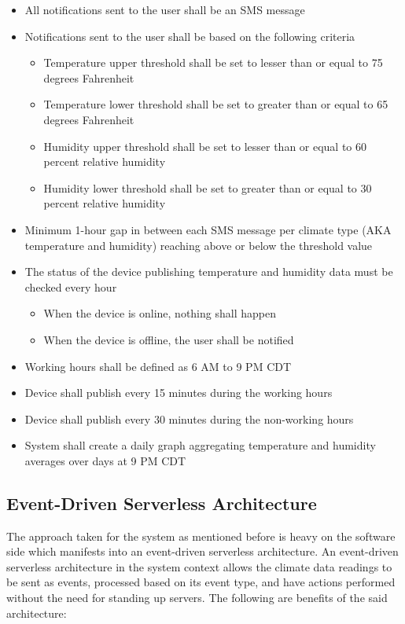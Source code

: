 \documentclass{article}
\begin{document}
\begin{itemize}
    \item All notifications sent to the user shall be an SMS message
    \item Notifications sent to the user shall be based on the following criteria
          \begin{itemize}
              \item Temperature upper threshold shall be set to lesser than or equal to 75 degrees Fahrenheit
              \item Temperature lower threshold shall be set to greater than or equal to 65 degrees Fahrenheit
              \item Humidity upper threshold shall be set to lesser than or equal to 60 percent relative humidity
              \item Humidity lower threshold shall be set to greater than or equal to 30 percent relative humidity
          \end{itemize}
    \item Minimum 1-hour gap in between each SMS message per climate type (AKA temperature and humidity) reaching above or below the threshold value
    \item The status of the device publishing temperature and humidity data must be checked every hour
          \begin{itemize}
              \item When the device is online, nothing shall happen
              \item When the device is offline, the user shall be notified
          \end{itemize}
    \item Working hours shall be defined as 6 AM to 9 PM CDT
    \item Device shall publish every 15 minutes during the working hours
    \item Device shall publish every 30 minutes during the non-working hours
    \item System shall create a daily graph aggregating temperature and humidity averages over days at 9 PM CDT
\end{itemize}

\subsection{Event-Driven Serverless Architecture}
The approach taken for the system as mentioned before is heavy on the software side which manifests into an event-driven serverless architecture. An event-driven serverless architecture in the system context allows the climate data readings to be sent as events, processed based on its event type, and have actions performed without the need for standing up servers. The following are benefits of the said architecture:
\end{document}
